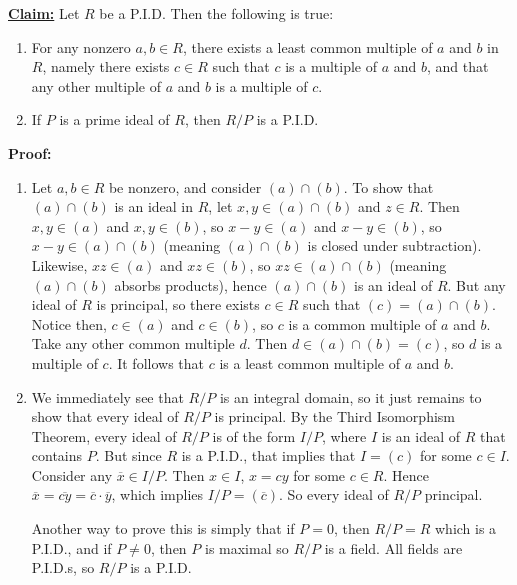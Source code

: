 \documentclass{article}
\begin{document}


\noindent \textbf{\underline{Claim:}} Let $R$ be a P.I.D. Then the following is true:

\begin{enumerate}
    \item For any nonzero $a,b\in R$, there exists a least common multiple of $a$ and $b$ in $R$, namely there exists $c\in R$ such that $c$ is a multiple of $a$ and $b$, and that any other multiple of $a$ and $b$ is a multiple of $c$.
    
    \item If $P$ is a prime ideal of $R$, then $R/P$ is a P.I.D.
    
\end{enumerate}

\noindent \textbf{Proof:}\begin{enumerate}
    \item Let $a,b\in R$ be nonzero, and consider $(a)\cap (b)$. To show that $(a)\cap (b)$ is an ideal in $R$, let $x,y\in (a)\cap (b)$ and $z\in R$. Then $x,y\in (a)$ and $x,y\in (b)$, so $x-y\in (a)$ and $x-y\in (b)$, so $x-y\in (a)\cap (b)$ (meaning $(a)\cap (b)$ is closed under subtraction). Likewise, $xz\in (a)$ and $xz\in (b)$, so $xz\in (a)\cap (b)$ (meaning $(a)\cap (b)$ absorbs products), hence $(a)\cap (b)$ is an ideal of $R$. But any ideal of $R$ is principal, so there exists $c\in R$ such that $(c)=(a)\cap (b)$. Notice then, $c\in (a)$ and $c\in (b)$, so $c$ is a common multiple of $a$ and $b$. Take any other common multiple $d$. Then $d\in (a)\cap (b) = (c)$, so $d$ is a multiple of $c$. It follows that $c$ is a least common multiple of $a$ and $b$.

    \item We immediately see that $R/P$ is an integral domain, so it just remains to show that every ideal of $R/P$ is principal. By the Third Isomorphism Theorem, every ideal of $R/P$ is of the form $I/P$, where $I$ is an ideal of $R$ that contains $P$. But since $R$ is a P.I.D., that implies that $I = (c)$ for some $c\in I$. Consider any $\overline{x}\in I/P$. Then $x\in I$, $x = cy$ for some $c\in R$. Hence $\overline{x} = \overline{cy} = \overline{c}\cdot \overline{y}$, which implies $I/P = (\overline{c})$. So every ideal of $R/P$ principal.
    
    Another way to prove this is simply that if $P=0$, then $R/P = R$ which is a P.I.D., and if $P\neq 0$, then $P$ is maximal so $R/P$ is a field. All fields are P.I.D.s, so $R/P$ is a P.I.D.

\end{enumerate}
\end{document}
